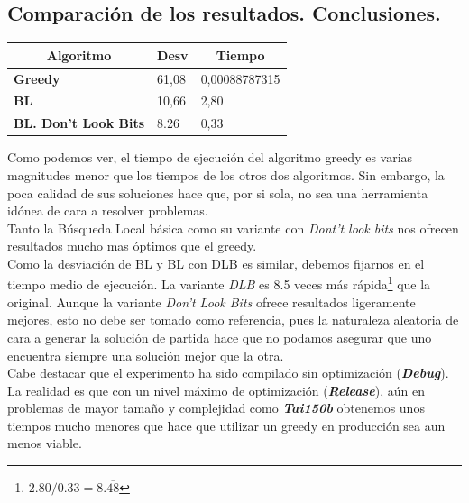 \documentclass[a4paper, 12pt]{article}
\begin{document}
      \newpage
      \subsection{Comparación de los resultados. Conclusiones.}
\begin{table}[H]
\centering
\label{my-label}
\begin{tabular}{|l|l|l|}
\hline
\multicolumn{1}{|c|}{\textbf{Algoritmo}} & \textbf{Desv} & \multicolumn{1}{c|}{\textbf{Tiempo}} \\ \hline
\textbf{Greedy}                          & 61,08         & 0,00088787315                        \\ \hline
\textbf{BL}                              & 10,66         & 2,80                                 \\ \hline
\textbf{BL. Don't Look Bits}             & 8.26          & 0,33                                 \\ \hline
\end{tabular}
\end{table}
      
      Como podemos ver, el tiempo de ejecución del algoritmo greedy es varias magnitudes menor que los tiempos de los otros dos algoritmos. Sin embargo, la poca calidad de sus soluciones hace que, por si sola, no sea una herramienta idónea de cara a resolver problemas.\\
      
      Tanto la Búsqueda Local básica como su variante con \textit{Dont't look bits} nos ofrecen resultados mucho mas óptimos que el greedy. \\
      
      Como la desviación de BL y BL con DLB es similar, debemos fijarnos en el tiempo medio de ejecución. La variante \textit{DLB} es 8.5 veces más rápida\footnote{$2.80/0.33 = 8.\overline{48}$} que la original. Aunque la variante \textit{Don't Look Bits} ofrece resultados ligeramente mejores, esto no debe ser tomado como referencia, pues la naturaleza aleatoria de cara a generar la solución de partida hace que no podamos asegurar que uno encuentra siempre una solución mejor que la otra.\\
      
      Cabe destacar que el experimento ha sido compilado sin optimización (\textbf{\textit{Debug}}). La realidad es que con un nivel máximo de optimización (\textbf{\textit{Release}}), aún en problemas de mayor tamaño y complejidad como \textbf{\textit{Tai150b}} obtenemos unos tiempos mucho menores que hace que utilizar un greedy en producción sea aun menos viable.\\
      
\end{document}
